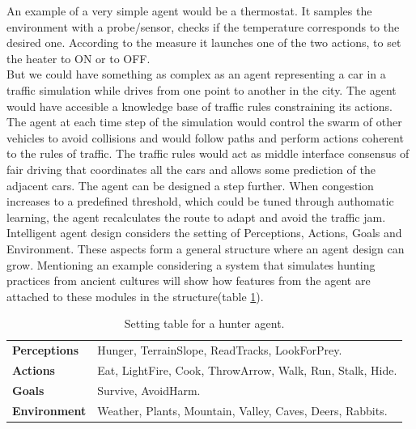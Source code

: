 \documentclass[11pt,oneside,a4paper,openright]{report}
\begin{document}
An example of a very simple agent would be a thermostat. It samples the environment with a probe/sensor, 
checks if the temperature corresponds to the desired one. According to the measure it launches one of the two 
actions, to set the heater to ON or to OFF.\\
But we could have something as complex as an agent representing a car in a traffic simulation while drives 
from one point to another in the city. The agent would have accesible a knowledge base of traffic rules 
constraining its actions. The agent at each time step of the simulation would control the swarm of other 
vehicles to avoid collisions and would follow paths and perform actions coherent to the rules of traffic. 
The traffic rules would act as middle interface consensus of fair driving that coordinates all the cars 
and allows some prediction of the adjacent cars. The agent can be designed a step further. When congestion 
increases to a predefined threshold, which could be tuned through authomatic learning, the agent recalculates 
the route to adapt and avoid the traffic jam.\\
Intelligent agent design considers the setting of Perceptions, Actions, Goals and Environment. These
aspects form a general structure where an agent design can grow. Mentioning an example considering a 
system that simulates hunting practices from ancient cultures will show how features from the agent are 
attached to these modules in the structure(table \ref{tab:hunterAgentSetting}).\\
	\begin{table}[h]
	\centering
	\begin{tabular}{|l||l|}
		\hline
		\textbf{Perceptions} & Hunger, TerrainSlope, ReadTracks, LookForPrey.\\
		\textbf{Actions} & Eat, LightFire, Cook, ThrowArrow, Walk, Run, Stalk, Hide.\\
		\textbf{Goals} & Survive, AvoidHarm.\\
		\textbf{Environment} & Weather, Plants, Mountain, Valley, Caves, Deers, Rabbits.\\ 
		\hline
	\end{tabular}
	\caption{Setting table for a hunter agent.}
	\label{tab:hunterAgentSetting}
	\end{table}

\end{document}
